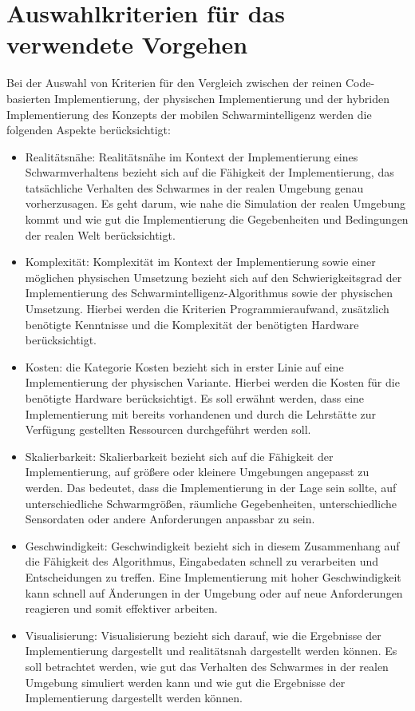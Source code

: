 \section{Auswahlkriterien für das verwendete Vorgehen}
Bei der Auswahl von Kriterien für den Vergleich zwischen der reinen Code-basierten Implementierung, der physischen Implementierung und der hybriden Implementierung des Konzepts der mobilen Schwarmintelligenz werden die folgenden Aspekte berücksichtigt:
\begin{itemize}
    \item Realitätsnähe: Realitätsnähe im Kontext der Implementierung eines Schwarmverhaltens bezieht sich auf die Fähigkeit der Implementierung, das tatsächliche Verhalten des Schwarmes in der realen Umgebung genau vorherzusagen. Es geht darum, wie nahe die Simulation der realen Umgebung kommt und wie gut die Implementierung die Gegebenheiten und Bedingungen der realen Welt berücksichtigt.
    \item Komplexität: Komplexität im Kontext der Implementierung sowie einer möglichen physischen Umsetzung bezieht sich auf den Schwierigkeitsgrad der Implementierung des Schwarmintelligenz-Algorithmus sowie der physischen Umsetzung. Hierbei werden die Kriterien Programmieraufwand, zusätzlich benötigte Kenntnisse und die Komplexität der benötigten Hardware berücksichtigt.
    \item Kosten: die Kategorie Kosten bezieht sich in erster Linie auf eine Implementierung der physischen Variante. Hierbei werden die Kosten für die benötigte Hardware berücksichtigt. Es soll erwähnt werden, dass eine Implementierung mit bereits vorhandenen und durch die Lehrstätte zur Verfügung gestellten Ressourcen durchgeführt werden soll.
    \item Skalierbarkeit: Skalierbarkeit bezieht sich auf die Fähigkeit der Implementierung, auf größere oder kleinere Umgebungen angepasst zu werden. Das bedeutet, dass die Implementierung in der Lage sein sollte, auf unterschiedliche Schwarmgrößen, räumliche Gegebenheiten, unterschiedliche Sensordaten oder andere Anforderungen anpassbar zu sein.
    \item Geschwindigkeit: Geschwindigkeit bezieht sich in diesem Zusammenhang auf die Fähigkeit des Algorithmus, Eingabedaten schnell zu verarbeiten und Entscheidungen zu treffen. Eine Implementierung mit hoher Geschwindigkeit kann schnell auf Änderungen in der Umgebung oder auf neue Anforderungen reagieren und somit effektiver arbeiten.
    \item Visualisierung: Visualisierung bezieht sich darauf, wie die Ergebnisse der Implementierung dargestellt und realitätsnah dargestellt werden können. Es soll betrachtet werden, wie gut das Verhalten des Schwarmes in der realen Umgebung simuliert werden kann und wie gut die Ergebnisse der Implementierung dargestellt werden können.
\end{itemize}

